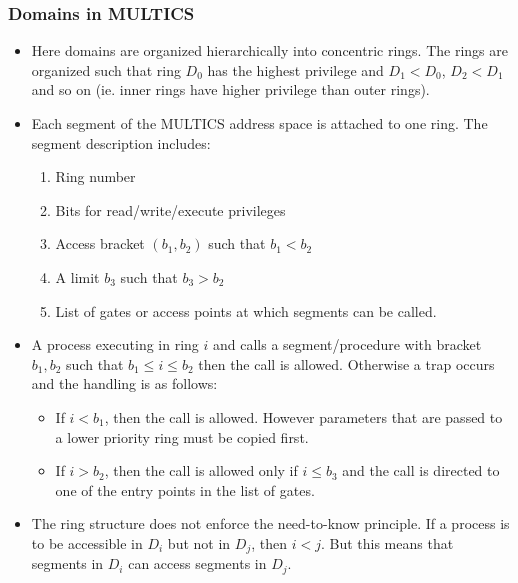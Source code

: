 \documentclass{article}
\theoremstyle{plain}
\theoremstyle{definition}
\begin{document}
\subsubsection{Domains in MULTICS}
\begin{itemize}
    \item Here domains are organized hierarchically into concentric rings. The rings are organized such that ring $D_0$ has the highest privilege and $D_1 < D_0$, $D_2 < D_1$ and so on (ie. inner rings have higher privilege than outer rings). 
    
    \item Each segment of the MULTICS address space is attached to one ring. The segment description includes:
    \begin{enumerate}
        \item Ring number
        
        \item Bits for read/write/execute privileges
        
        \item Access bracket $(b_1, b_2)$ such that $b_1 < b_2$
        
        \item A limit $b_3$ such that $b_3 > b_2$
        
        \item List of gates or access points at which segments can be called. 
    \end{enumerate}
    
    \item A process executing in ring $i$ and calls a segment/procedure with bracket $b_1, b_2$ such that $b_1 \le i \le b_2$ then the call is allowed. Otherwise a trap occurs and the handling is as follows:
    \begin{itemize}
        \item If $i < b_1$, then the call is allowed. However parameters that are passed to a lower priority ring must be copied first. 
        
        \item If $i > b_2$, then the call is allowed only if $i \le b_3$ and the call is directed to one of the entry points in the list of gates. 
    \end{itemize}
    \item The ring structure does not enforce the need-to-know principle. If a process is to be accessible in $D_i$ but not in $D_j$, then $i < j$. But this means that segments in $D_i$ can access segments in $D_j$. 
\end{itemize}
\end{document}
